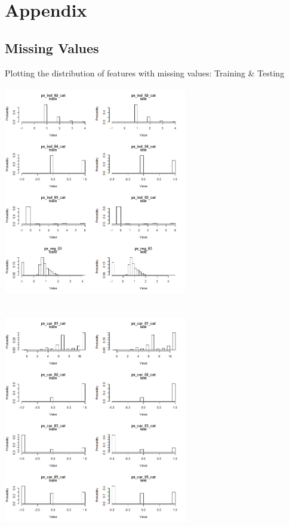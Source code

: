 \documentclass[fleqn,10pt]{SelfArx} %
\begin{document}
\section{Appendix}
\subsection{Missing Values}
Plotting the distribution of features with missing values: Training \& Testing\\
\includegraphics[width=8cm, height=10cm]{comp_1} \\
\includegraphics[width=8cm, height=10cm]{comp_2} \\
\end{document}

